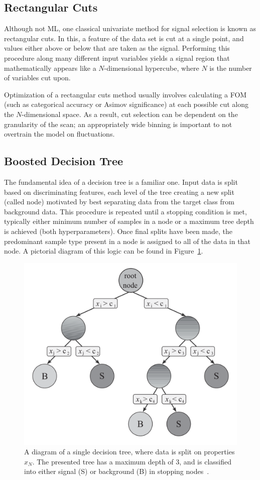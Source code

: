 \subsection{Rectangular Cuts}\label{ssec:rect-cuts}

Although not \gls{ML}, one classical univariate method for signal selection is known as rectangular cuts. In this, a feature of the data set is cut at a single point, and values either above or below that are taken as the signal. Performing this procedure along many different input variables yields a signal region that mathematically appears like a $N$-dimensional hypercube, where $N$ is the number of variables cut upon. 

Optimization of a rectangular cuts method usually involves calculating a \gls{FOM} (such as categorical accuracy or Asimov significance) at each possible cut along the $N$-dimensional space. As a result, cut selection can be dependent on the granularity of the scan; an appropriately wide binning is important to not overtrain the model on fluctuations.

\subsection{Boosted Decision Tree}\label{ssec:bdt}

The fundamental idea of a decision tree is a familiar one. Input data is split based on discriminating features, each level of the tree creating a new split (called node) motivated by best separating data from the target class from background data. This procedure is repeated until a stopping condition is met, typically either minimum number of samples in a node or a maximum tree depth is achieved (both hyperparameters). Once final splits have been made, the predominant sample type present in a node is assigned to all of the data in that node. A pictorial diagram of this logic can be found in Figure~\ref{fig:bdt}.

\begin{figure}[!ht] 
    \centering
    \includegraphics[width=.7\textwidth]{appendices/images/bdt.png}
    \caption[A diagram of a single decision tree]{A diagram of a single decision tree, where data is split on properties $x_N$. The presented tree has a maximum depth of 3, and is classified into either signal (S) or background (B) in stopping nodes~\cite{data-analysis}.}
    \label{fig:bdt}
\end{figure}

